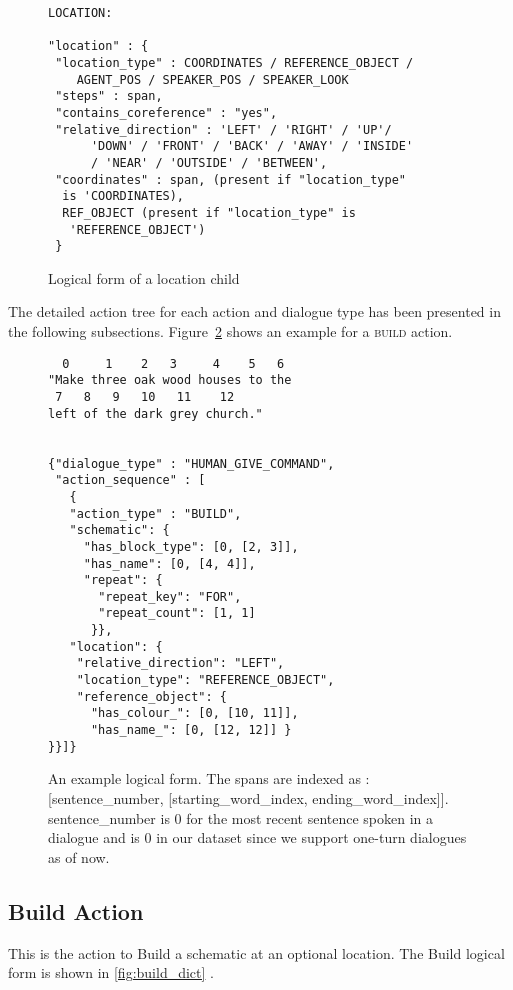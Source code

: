 \begin{figure}[ht]
    \centering
    \fontsize{7pt}{8pt}\selectfont
    \begin{verbatim}
LOCATION:

"location" : {
 "location_type" : COORDINATES / REFERENCE_OBJECT / 
    AGENT_POS / SPEAKER_POS / SPEAKER_LOOK
 "steps" : span,
 "contains_coreference" : "yes",
 "relative_direction" : 'LEFT' / 'RIGHT' / 'UP'/ 
      'DOWN' / 'FRONT' / 'BACK' / 'AWAY' / 'INSIDE'
      / 'NEAR' / 'OUTSIDE' / 'BETWEEN',
 "coordinates" : span, (present if "location_type"
  is 'COORDINATES),
  REF_OBJECT (present if "location_type" is 
   'REFERENCE_OBJECT')
 }
    \end{verbatim}
    \vspace{-20pt}
    \caption{Logical form of a location child}
    \vspace{-8pt}
    \label{fig:location}
\end{figure}


The detailed action tree for each action and dialogue type has been presented in the following subsections. Figure~\ref{fig:action_tree_ex} shows an example for a \textsc{build} action.

\begin{figure}[ht]
    \centering
    \small
    \begin{verbatim}
  0     1    2   3     4    5   6
"Make three oak wood houses to the
 7   8   9   10   11    12
left of the dark grey church."


{"dialogue_type" : "HUMAN_GIVE_COMMAND",
 "action_sequence" : [
   {
   "action_type" : "BUILD",
   "schematic": {
     "has_block_type": [0, [2, 3]],
     "has_name": [0, [4, 4]],
     "repeat": {
       "repeat_key": "FOR",
       "repeat_count": [1, 1]
      }},
   "location": {
    "relative_direction": "LEFT",
    "location_type": "REFERENCE_OBJECT",
    "reference_object": {
      "has_colour_": [0, [10, 11]],
      "has_name_": [0, [12, 12]] }
}}]}
    \end{verbatim}
    \vspace{-20pt}
    \caption{An example logical form. The spans are indexed as : [sentence\_number, [starting\_word\_index, ending\_word\_index]].  sentence\_number is 0 for the most recent sentence spoken in a dialogue and is 0 in our dataset since we support one-turn dialogues as of now.}
    \vspace{-8pt}
    \label{fig:action_tree_ex}
\end{figure}


\subsection{ Build Action}
This is the action to Build a schematic at an optional location. The Build logical form is shown in \ref{fig:build_dict} .


